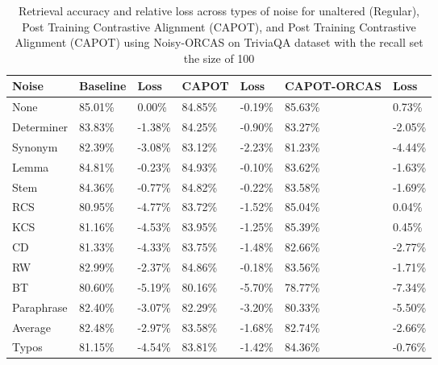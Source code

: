 \begin{table*}[!ht]
    \centering
    \begin{tabular}{|l|l|l|l|l|l|l|}
    \hline
        Noise & Baseline & Loss & CAPOT & Loss & CAPOT-ORCAS & Loss \\ \hline
        None & 85.01\% & 0.00\% & 84.85\% & -0.19\% & 85.63\% & 0.73\% \\ \hline
        Determiner & 83.83\% & -1.38\% & 84.25\% & -0.90\% & 83.27\% & -2.05\% \\ \hline
        Synonym & 82.39\% & -3.08\% & 83.12\% & -2.23\% & 81.23\% & -4.44\% \\ \hline
        Lemma & 84.81\% & -0.23\% & 84.93\% & -0.10\% & 83.62\% & -1.63\% \\ \hline
        Stem & 84.36\% & -0.77\% & 84.82\% & -0.22\% & 83.58\% & -1.69\% \\ \hline
        RCS & 80.95\% & -4.77\% & 83.72\% & -1.52\% & 85.04\% & 0.04\% \\ \hline
        KCS & 81.16\% & -4.53\% & 83.95\% & -1.25\% & 85.39\% & 0.45\% \\ \hline
        CD & 81.33\% & -4.33\% & 83.75\% & -1.48\% & 82.66\% & -2.77\% \\ \hline
        RW & 82.99\% & -2.37\% & 84.86\% & -0.18\% & 83.56\% & -1.71\% \\ \hline
        BT & 80.60\% & -5.19\% & 80.16\% & -5.70\% & 78.77\% & -7.34\% \\ \hline
        Paraphrase & 82.40\% & -3.07\% & 82.29\% & -3.20\% & 80.33\% & -5.50\% \\ \hline
        Average & 82.48\% & -2.97\% & 83.58\% & -1.68\% & 82.74\% & -2.66\% \\ \hline
        Typos & 81.15\% & -4.54\% & 83.81\% & -1.42\% & 84.36\% & -0.76\% \\ \hline
    \end{tabular}
    \caption{Retrieval accuracy and relative loss across types of noise for unaltered (Regular),  Post Training Contrastive Alignment (CAPOT), and Post Training Contrastive Alignment (CAPOT) using Noisy-ORCAS on TriviaQA dataset with the recall set the size of 100}
    \label{tab:capot-orcasvsnot-100}
\end{table*}
